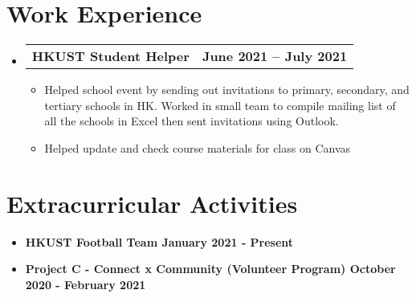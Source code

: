 \documentclass[letterpaper,11pt]{article}
\makeatletter
\newcommand{\resumeItem}[1]{
  \item\small{
    {#1 \vspace{-2pt}}
  }
}
\newcommand{\resumeSubheading}[4]{
  \vspace{-2pt}\item
    \begin{tabular*}{1.0\textwidth}[t]{l@{\extracolsep{\fill}}r}
      \textbf{\large#1} & \textbf{\small #2} \\
    \end{tabular*}\vspace{-7pt}
}
\newcommand{\resumeSubHeadingListStart}{\begin{itemize}[leftmargin=0.0in, label={}]}
\newcommand{\resumeSubHeadingListEnd}{\end{itemize}}
\newcommand{\resumeItemListStart}{\begin{itemize}}
\newcommand{\resumeItemListEnd}{\end{itemize}\vspace{-5pt}}
\makeatother
\begin{document}
\section{Work Experience}
  \resumeSubHeadingListStart
    \vspace{3pt}
    \resumeSubheading
      {HKUST Student Helper}{June 2021 -- July 2021} 
      {}{}
      \resumeItemListStart
        \resumeItem{\normalsize{Helped school event by sending out invitations to primary, secondary, and tertiary schools in HK. Worked in small team to compile mailing list of all the schools in Excel then sent invitations using Outlook.}}
        \resumeItem{\normalsize{Helped update and check course materials for class on Canvas}}
      \resumeItemListEnd  
  \resumeSubHeadingListEnd
\vspace{1pt}

\section{Extracurricular Activities}
    \begin{itemize}[itemsep=-2pt, parsep=5pt] 
        \item \textbf {HKUST Football Team \hfill January 2021 - Present}
        \item \textbf {Project C - Connect x Community (Volunteer Program) \hfill October 2020 - February 2021}
    \end{itemize}
\end{document}
